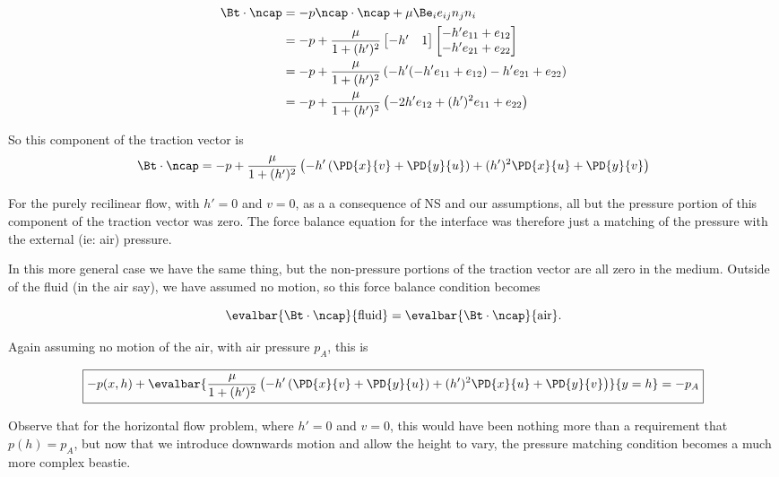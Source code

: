 \begin{align*}
\Bt \cdot \ncap 
&=
-p \ncap \cdot \ncap + \mu \Be_i e_{ij} n_j n_i \\
&=
-p
+
\frac{\mu}{1 + (h')^2}
\begin{bmatrix}
-h' & 1
\end{bmatrix}
\begin{bmatrix}
-h' e_{11} + e_{12} \\
-h' e_{21} + e_{22}
\end{bmatrix} \\
&=
-p
+
\frac{\mu}{1 + (h')^2}
\left(
-h'(-h' e_{11} + e_{12}) -h' e_{21} + e_{22}
\right)  \\
&=
-p
+
\frac{\mu}{1 + (h')^2}
\left(
-2 h' e_{12} 
+ (h')^2 e_{11} + e_{22}
\right)
\end{align*}

So this component of the traction vector is
\begin{equation}\label{eqn:inclinedFlowWithoutConstantHeightAssumption:240}
\Bt \cdot \ncap 
=
-p
+
\frac{\mu}{1 + (h')^2}
\left(
- h' 
\left( 
\PD{x}{v} +
\PD{y}{u}
\right)
+ (h')^2 \PD{x}{u} 
 + \PD{y}{v} 
\right)
\end{equation}

For the purely recilinear flow, with $h' = 0$ and $v = 0$, as a a consequence of NS and our assumptions, all but the pressure portion of this component of the traction vector was zero.  The force balance equation for the interface was therefore just a matching of the pressure with the external (ie: air) pressure.

In this more general case we have the same thing, but the non-pressure portions of the traction vector are all zero in the medium.  Outside of the fluid (in the air say), we have assumed no motion, so this force balance condition becomes

\begin{equation}\label{eqn:inclinedFlowWithoutConstantHeightAssumption:260}
\evalbar{\Bt \cdot \ncap}{\text{fluid}}
=
\evalbar{\Bt \cdot \ncap}{\text{air}}.
\end{equation}

Again assuming no motion of the air, with air pressure $p_A$, this is

\begin{equation}\label{eqn:inclinedFlowWithoutConstantHeightAssumption:280}
\boxed{
-p(x, h)
+
\evalbar{
\frac{\mu}{1 + (h')^2}
\left(
- h' 
\left( 
\PD{x}{v} +
\PD{y}{u}
\right)
+ (h')^2 \PD{x}{u} 
 + \PD{y}{v} 
\right)
}{y = h}
= -p_A
}
\end{equation}

Observe that for the horizontal flow problem, where $h' = 0$ and $v = 0$, this would have been nothing more than a requirement that $p(h) = p_A$, but now that we introduce downwards motion and allow the height to vary, the pressure matching condition becomes a much more complex beastie.

\EndNoBibArticle
